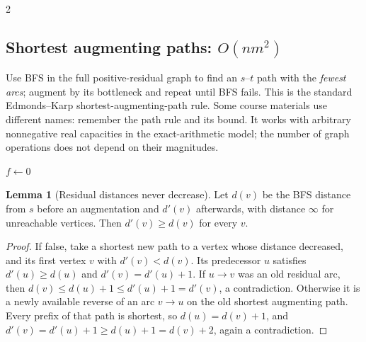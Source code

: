 \documentclass[8pt]{extarticle}
\theoremstyle{definition}
\newtheorem{lemma}[definition]{Lemma}
\begin{document}
\begin{multicols*}{2}
\subsection{Shortest augmenting paths: \texorpdfstring{$O(nm^2)$}{O(n m squared)}}\label{nf:sap}
Use BFS in the full positive-residual graph to find an $s$--$t$ path with the
\emph{fewest arcs}; augment by its bottleneck and repeat until BFS fails.
This is the standard Edmonds--Karp shortest-augmenting-path rule. Some course
materials use different names: remember the path rule and its bound.
It works with arbitrary nonnegative real capacities in the exact-arithmetic
model; the number of graph operations does not depend on their magnitudes.


\begin{algorithm}[H]
\caption{Shortest augmenting paths (BFS; not arbitrary path choice)}
$f\gets0$\;
\;
\end{algorithm}

\begin{lemma}[Residual distances never decrease]\label{nf:distance}
Let $d(v)$ be the BFS distance from $s$ before an augmentation and $d'(v)$
afterwards, with distance $\infty$ for unreachable vertices. Then
$d'(v)\ge d(v)$ for every $v$.
\end{lemma}
\begin{proof}
If false, take a shortest new path to a vertex whose distance decreased,
and its first vertex $v$ with $d'(v)<d(v)$. Its predecessor $u$ satisfies
$d'(u)\ge d(u)$ and $d'(v)=d'(u)+1$. If $u\to v$ was an old residual arc,
then $d(v)\le d(u)+1\le d'(u)+1=d'(v)$, a contradiction.
Otherwise it is a newly available reverse of an arc $v\to u$ on the old
shortest augmenting path. Every prefix of that path is shortest, so
$d(u)=d(v)+1$, and
$d'(v)=d'(u)+1\ge d(u)+1=d(v)+2$, again a contradiction.
\end{proof}


\end{multicols*}
\end{document}
